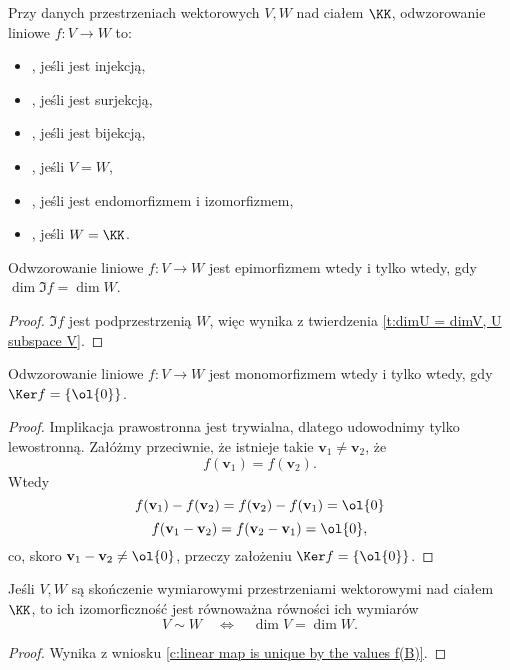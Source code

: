 \begin{definition}
    Przy danych przestrzeniach wektorowych $V, W$ nad ciałem $\KK$, odwzorowanie liniowe $f : V \to W$ to:
    \begin{itemize}
        \item {}, jeśli jest injekcją,
        \item {}, jeśli jest surjekcją,
        \item {}, jeśli jest bijekcją,
        \item {}, jeśli $V = W$,
        \item {}, jeśli jest endomorfizmem i izomorfizmem,
        \item {}, jeśli $W = \KK$.
    \end{itemize}
\end{definition}

\begin{theorem}
    Odwzorowanie liniowe $f : V \to W$ jest epimorfizmem wtedy i tylko wtedy, gdy $\dim\Im f = \dim W$.
\end{theorem}
\begin{proof}
    $\Im f$ jest podprzestrzenią $W$, więc wynika z twierdzenia \ref{t:dimU = dimV, U subspace V}.
\end{proof}

\begin{theorem}
    Odwzorowanie liniowe $f : V \to W$ jest monomorfizmem wtedy i tylko wtedy, gdy $\Ker f = \{\ol{0}\}$.
\end{theorem}
\begin{proof}
    Implikacja prawostronna jest trywialna, dlatego udowodnimy tylko lewostronną. Załóżmy przeciwnie, że istnieje takie $\mathbf{v}_1 \neq \mathbf{v}_2$, że
    \[ f(\mathbf{v}_1) = f(\mathbf{v}_2). \]
    Wtedy
    \[ f(\mathbf{v}_1) - f(\mathbf{v}_2) = f(\mathbf{v}_2) - f(\mathbf{v}_1) = \ol{0} \]
    \[ f(\mathbf{v}_1 - \mathbf{v}_2) = f(\mathbf{v}_2 - \mathbf{v}_1) = \ol{0}, \]
    co, skoro $\mathbf{v}_1 - \mathbf{v}_2 \neq \ol{0}$, przeczy założeniu $\Ker f = \{\ol{0}\}$.
\end{proof}

\begin{theorem}
    Jeśli $V, W$ są skończenie wymiarowymi przestrzeniami wektorowymi nad ciałem $\KK$, to ich izomorficzność jest równoważna równości ich wymiarów
    \[ V \sim W \quad \iff \quad \dim V = \dim W. \]
\end{theorem}
\begin{proof}
    Wynika z wniosku \ref{c:linear map is unique by the values f(B)}.
\end{proof}

